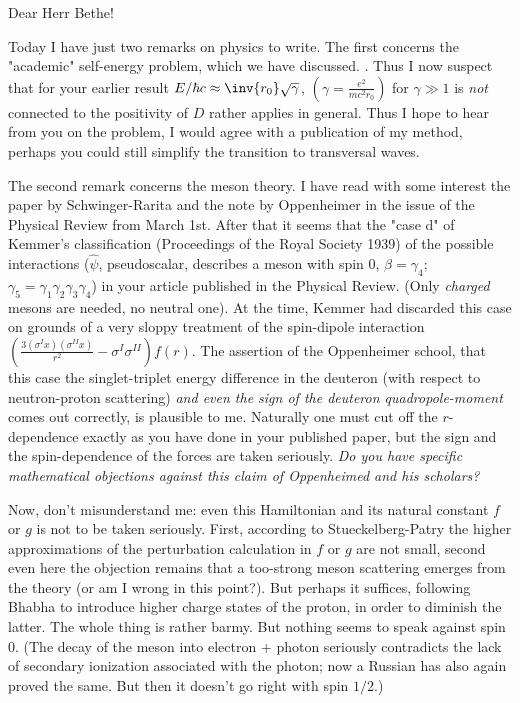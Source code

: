 \date{March 17, 1941}

Dear Herr Bethe!

Today I have just two remarks on physics to write. The first concerns the "academic" self-energy problem, which we have discussed. . Thus I now suspect that for your earlier result $E/\hbar c \approx \inv{r_0}\sqrt{\gamma}$, $\left(\gamma = \frac{e^2}{mc^2r_0}\right)$ for $\gamma \gg 1$ is \textit{not} connected to the positivity of $D$ rather applies in general. Thus I hope to hear from you on the problem, I would agree with a publication of my method, perhaps you could still simplify the transition to transversal waves.

The second remark concerns the meson theory. I have read with some interest the paper by Schwinger-Rarita and the note by Oppenheimer in the issue of the Physical Review from March 1st. After that it seems that the "case d" of Kemmer's classification (Proceedings of the Royal Society 1939) of the possible interactions ($\hat{\psi}$, pseudoscalar, describes a meson with spin 0,
$\beta = \gamma_4$; $\gamma_5 = \gamma_1\gamma_2\gamma_3\gamma_4$) in your article published in the Physical Review. (Only \textit{charged} mesons are needed, no neutral one). At the time, Kemmer had discarded this case on grounds of a very sloppy treatment of the spin-dipole interaction $\left(\frac{3(\sigma^Ix)(\sigma^{II}x)}{r^2} - \sigma^I\sigma^{II}\right)f(r)$. The assertion of the Oppenheimer school, that this case the singlet-triplet energy difference in the deuteron (with respect to neutron-proton scattering) \textit{and even the sign of the deuteron quadropole-moment} comes out correctly, is plausible to me. Naturally one must cut off the $r$-dependence exactly as you have done in your published paper, but the sign and the spin-dependence of the forces are taken seriously. \textit{Do you have specific mathematical objections against this claim of Oppenheimed and his scholars?}

Now, don't misunderstand me: even this Hamiltonian and its natural constant $f$ or $g$ is not to be taken seriously. First, according to Stueckelberg-Patry the higher approximations of the perturbation calculation in $f$ or $g$ are not small, second even here the objection remains that a too-strong meson scattering emerges from the theory (or am I wrong in this point?). But perhaps it suffices, following Bhabha to introduce higher charge states of the proton, in order to diminish the latter. The whole thing is rather barmy. But nothing seems to speak against spin 0. (The decay of the meson into electron + photon seriously contradicts the lack of secondary ionization associated with the photon; now a Russian has also again proved the same. But then it doesn't go right with spin $1/2$.)

